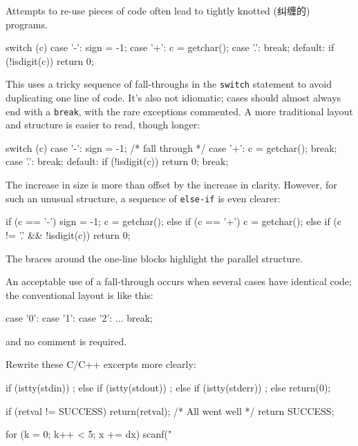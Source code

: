 Attempts to re-use pieces of code often lead to tightly knotted (纠缠的) programs.
\begin{badcode}
    switch (c) {
    case '-': sign = -1;
    case '+': c = getchar();
    case '.': break;
    default: if (!isdigit(c))
                return 0;
    }
\end{badcode}
This uses a tricky sequence of fall-throughs in the \verb'switch' statement
to avoid duplicating one line of code. It's also not idiomatic; cases
should almost always end with a \verb'break', with the rare exceptions
commented. A more traditional layout and structure is easier to read,
though longer:
\begin{badcode}
    switch (c) {
    case '-':
        sign = -1;
        /* fall through */
    case '+':
        c = getchar();
        break;
    case '.':
        break;
    default:
        if (!isdigit(c))
            return 0;
        break;
    }
\end{badcode}
The increase in size is more than offset by the increase in clarity.
However, for such an unusual structure, a sequence of \verb'else-if' is
even clearer:
\begin{wellcode}
    if (c == '-') {
        sign = -1;
        c = getchar();
    } else if (c == '+') {
        c = getchar();
    } else if (c != '.' && !isdigit(c)) {
        return 0;
    }
\end{wellcode}
The braces around the one-line blocks highlight the parallel structure.

An acceptable use of a fall-through occurs when several cases have
identical code; the conventional layout is like this:
\begin{wellcode}
    case '0':
    case '1':
    case '2':
        ...
        break;
\end{wellcode}
and no comment is required.

\begin{exercise}
    Rewrite these C/C++ excerpts more clearly:

    \begin{badcode}
        if (istty(stdin)) ;
        else if (istty(stdout)) ;
            else if (istty(stderr)) ;
                else return(0);
    \end{badcode}

    \begin{badcode}
        if (retval != SUCCESS)
            return(retval);
        /* All went well */
        return SUCCESS;
    \end{badcode}

    \begin{badcode}
        for (k = 0; k++ < 5; x += dx)
            scanf("%
    \end{badcode}
\end{exercise}

